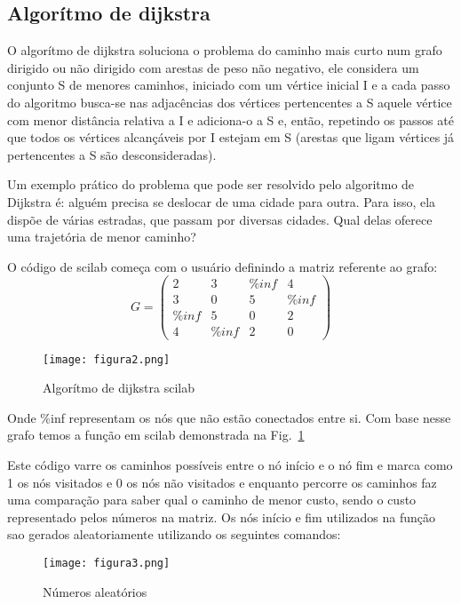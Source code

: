 \subsection{Algorítmo de dijkstra} \label{dijkstra}
O algorítmo de dijkstra soluciona o problema do caminho mais curto num grafo dirigido ou não dirigido com arestas de peso não negativo, ele considera um conjunto S de menores caminhos, iniciado com um vértice inicial I e a cada passo do algoritmo busca-se nas adjacências dos vértices pertencentes a S aquele vértice com menor distância relativa a I e adiciona-o a S e, então, repetindo os passos até que todos os vértices alcançáveis por I estejam em S (arestas que ligam vértices já pertencentes a S são desconsideradas).

Um exemplo prático do problema que pode ser resolvido pelo algoritmo de Dijkstra é: alguém precisa se deslocar de uma cidade para outra. Para isso, ela dispõe de várias estradas, que passam por diversas cidades. Qual delas oferece uma trajetória de menor caminho?

O código de scilab começa com o usuário definindo a matriz referente ao grafo:
\[G = \begin{pmatrix}
2 & 3 & \%inf & 4\\ 
3 & 0 & 5 & \%inf\\ 
\%inf & 5 & 0 & 2\\ 
4 & \%inf & 2 & 0
\end{pmatrix}\]

\begin{figure}[!h]
\centering
\texttt{[image: figura2.png]}
%
\caption{Algorítmo de dijkstra scilab}
\label{fig2}
\end{figure}

Onde \%inf representam os nós que não estão conectados entre si. Com base nesse grafo temos a função em scilab demonstrada na Fig.~\ref{fig2}

Este código varre os caminhos possíveis entre o nó início e o nó fim e marca como 1 os nós visitados e 0 os nós não visitados e enquanto percorre os caminhos faz uma comparação para saber qual o caminho de menor custo, sendo o custo representado pelos números na matriz. Os nós início e fim utilizados na função sao gerados aleatoriamente utilizando os seguintes comandos:

\begin{figure}[!h]
\centering
\texttt{[image: figura3.png]}
%
\caption{Números aleatórios}
\label{fig3}
\end{figure}

